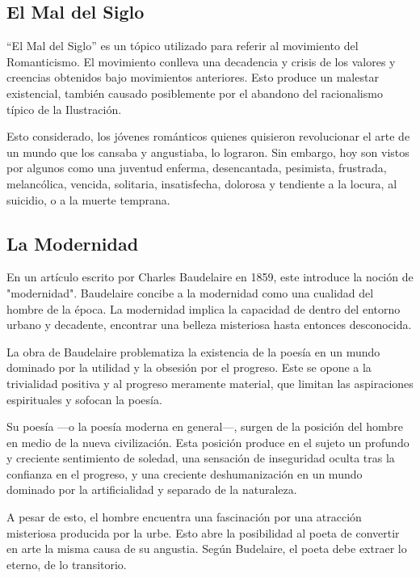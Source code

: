 \documentclass{article}
\begin{document}
\subsection{El Mal del Siglo}

``El Mal del Siglo'' es un tópico utilizado para referir al movimiento del Romanticismo. El movimiento conlleva una decadencia y crisis de los valores y creencias obtenidos bajo movimientos anteriores. Esto produce un malestar existencial, también causado posiblemente por el abandono del racionalismo típico de la Ilustración.

Esto considerado, los jóvenes románticos quienes quisieron revolucionar el arte de un mundo que los cansaba y angustiaba, lo lograron. Sin embargo, hoy son vistos por algunos como una juventud enferma, desencantada, pesimista, frustrada, melancólica, vencida, solitaria, insatisfecha, dolorosa y tendiente a la locura, al
suicidio, o a la muerte temprana.

\subsection{La Modernidad}

En un artículo escrito por Charles Baudelaire en 1859, este introduce la noción de "modernidad". Baudelaire concibe a la modernidad como una cualidad del hombre de la época. La modernidad implica la capacidad de dentro del entorno urbano y decadente, encontrar una belleza misteriosa hasta entonces desconocida.

La obra de Baudelaire problematiza la existencia de la poesía en un mundo dominado por la utilidad y la obsesión por el progreso. Este se opone a la trivialidad positiva y al progreso meramente material, que limitan las aspiraciones espirituales y sofocan la poesía.

Su poesía ---o la poesía moderna en general---, surgen de la posición del hombre en medio de la nueva civilización. Esta posición produce en el sujeto un profundo y creciente sentimiento de soledad, una sensación de inseguridad oculta tras la confianza en el progreso, y una creciente deshumanización en un mundo dominado por la artificialidad y separado de la naturaleza.

A pesar de esto, el hombre encuentra una fascinación por una atracción misteriosa producida por la urbe. Esto abre la posibilidad al poeta de convertir en arte la misma causa de su angustia. Según Budelaire, el poeta debe extraer lo eterno, de lo transitorio.
\end{document}
